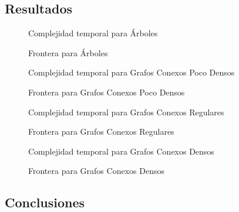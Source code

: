 \subsection{Resultados}
\begin{figure}[H]
    \centering
    \fontsize{7}{10}\selectfont
    \resizebox{0.80\textwidth}{!}{}
    \caption{Complejidad temporal para \'Arboles}
\end{figure}

\begin{figure}[H]
    \centering
    \fontsize{7}{10}\selectfont
    \resizebox{0.80\textwidth}{!}{}
    \caption{Frontera para \'Arboles}
\end{figure}

\begin{figure}[H]
    \centering
    \fontsize{7}{10}\selectfont
    \resizebox{0.80\textwidth}{!}{}
    \caption{Complejidad temporal para Grafos Conexos Poco Densos}
\end{figure}

\begin{figure}[H]
    \centering
    \fontsize{7}{10}\selectfont
    \resizebox{0.80\textwidth}{!}{}
    \caption{Frontera para Grafos Conexos Poco Densos}
\end{figure}

\begin{figure}[H]
    \centering
    \fontsize{7}{10}\selectfont
    \resizebox{0.80\textwidth}{!}{}
    \caption{Complejidad temporal para Grafos Conexos Regulares}
\end{figure}

\begin{figure}[H]
    \centering
    \fontsize{7}{10}\selectfont
    \resizebox{0.80\textwidth}{!}{}
    \caption{Frontera para Grafos Conexos Regulares}
\end{figure}

\begin{figure}[H]
    \centering
    \fontsize{7}{10}\selectfont
    \resizebox{0.80\textwidth}{!}{}
    \caption{Complejidad temporal para Grafos Conexos Densos}
\end{figure}

\begin{figure}[H]
    \centering
    \fontsize{7}{10}\selectfont
    \resizebox{0.80\textwidth}{!}{}
    \caption{Frontera para Grafos Conexos Densos}
\end{figure}

\subsection{Conclusiones}
